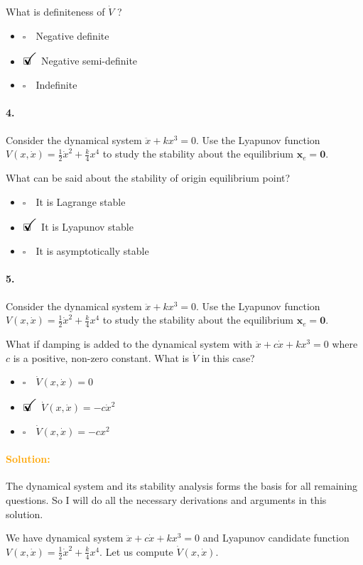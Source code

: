 \documentclass[12pt, a4paper]{article}
\newcommand{\ans}{\item[]$\rlap{\LARGE{\checkmark}}\square\quad$}
\newcommand{\noans}{\item[]$\square\quad$}
\begin{document}
What is definiteness of $\dot{V}$ ?

\begin{itemize}
    \noans Negative definite
    \ans Negative semi-definite
    \noans Indefinite
\end{itemize}

\paragraph{4.}
Consider the dynamical system $\ddot{x}+kx^{3}=0$. Use the Lyapunov function $V(x,\dot{x})=\frac{1}{2}\dot{x}^{2} + \frac{k}{4}x^{4}$ to study the stability about the equilibrium $\bm{x}_{e}=\bm{0}$. \medskip

What can be said about the stability of origin equilibrium point?

\begin{itemize}
    \noans It is Lagrange stable
    \ans It is Lyapunov stable
    \noans It is asymptotically stable
\end{itemize}

\paragraph{5.}
Consider the dynamical system $\ddot{x}+kx^{3}=0$. Use the Lyapunov function $V(x,\dot{x})=\frac{1}{2}\dot{x}^{2} + \frac{k}{4}x^{4}$ to study the stability about the equilibrium $\bm{x}_{e}=\bm{0}$. \medskip

What if damping is added to the dynamical system with $\ddot{x}+c\dot{x}+kx^{3}=0$ where $c$ is a positive, non-zero constant. What is $\dot{V}$ in this case?

\begin{itemize}
    \noans $\dot{V}(x,\dot{x}) = 0$
    \ans $\dot{V}(x,\dot{x}) = -c\dot{x}^{2}$
    \noans $\dot{V}(x,\dot{x}) = -cx^{2}$
\end{itemize}

\paragraph{\textcolor{orange}{Solution:}}The dynamical system and its stability analysis forms the basis for all remaining questions. So I will do all the necessary derivations and arguments in this solution.

We have dynamical system $\ddot{x}+c\dot{x}+kx^{3}=0$ and Lyapunov candidate function $V(x,\dot{x})=\frac{1}{2}\dot{x}^{2} + \frac{k}{4}x^{4}$. Let us compute $\dot{V}(x,\dot{x})$.
\end{document}
